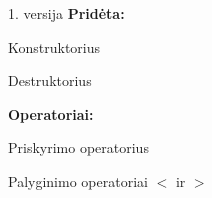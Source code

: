 1. versija {\bfseries{Pridėta\+:}}
\begin{DoxyItemize}
\item Konstruktorius
\item Destruktorius
\item {\bfseries{Operatoriai\+:}}
\begin{DoxyItemize}
\item Priskyrimo operatorius
\item Palyginimo operatoriai $<$ ir $>$ 
\end{DoxyItemize}
\end{DoxyItemize}